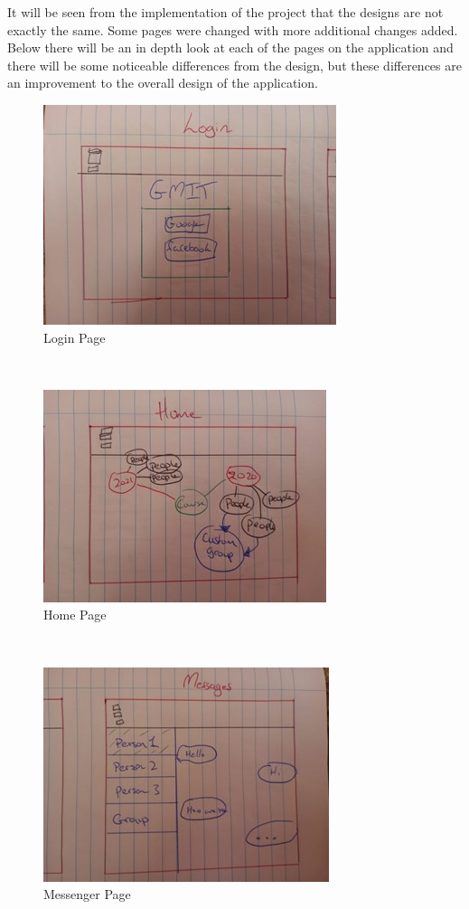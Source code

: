 It will be seen from the implementation of the project that the designs are not exactly the same. Some pages were changed with more additional changes added. Below there will be an in depth look at each of the pages on the application and there will be some noticeable differences from the design, but these differences are an improvement to the overall design of the application. \\

\begin{figure}[p]
    \centering
    \includegraphics{img/Home Design.jpg}
    \caption{Login Page}
    \label{fig:my_label}
\end{figure}
\\
\begin{figure}[p]
    \centering
    \includegraphics{img/Login.jpg}
    \caption{Home Page}
    \label{fig:my_label}
\end{figure}
\\
\begin{figure}[p]
    \centering
    \includegraphics{img/Messenger.jpg}
    \caption{Messenger Page}
    \label{fig:my_label}
\end{figure}
